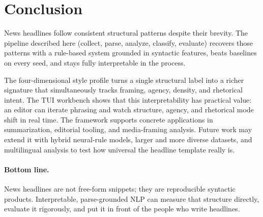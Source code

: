 \documentclass[11pt]{article}
\begin{document}
\section{Conclusion}
News headlines follow consistent structural patterns despite their brevity. The pipeline described here (collect, parse, analyze, classify, evaluate) recovers those patterns with a rule-based system grounded in syntactic features, beats baselines on every seed, and stays fully interpretable in the process.

The four-dimensional style profile turns a single structural label into a richer signature that simultaneously tracks framing, agency, density, and rhetorical intent. The TUI workbench shows that this interpretability has practical value: an editor can iterate phrasing and watch structure, agency, and rhetorical mode shift in real time. The framework supports concrete applications in summarization, editorial tooling, and media-framing analysis. Future work may extend it with hybrid neural-rule models, larger and more diverse datasets, and multilingual analysis to test how universal the headline template really is.

\paragraph{Bottom line.} News headlines are not free-form snippets; they are reproducible syntactic products. Interpretable, parse-grounded NLP can measure that structure directly, evaluate it rigorously, and put it in front of the people who write headlines.


\end{document}
